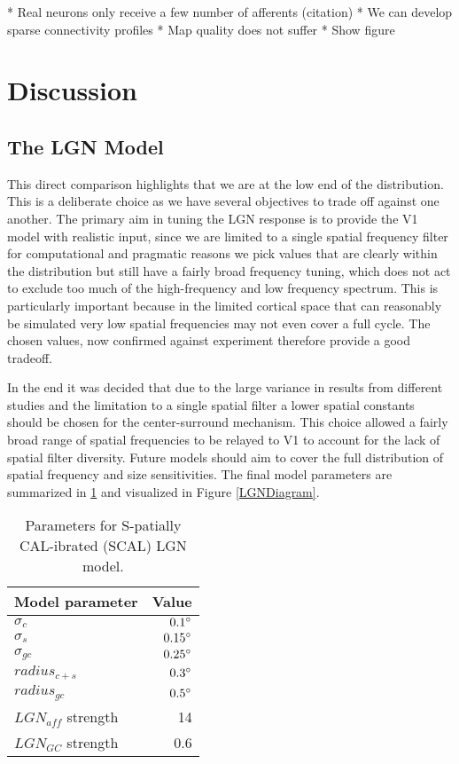 * Real neurons only receive a few number of afferents (citation)
* We can develop sparse connectivity profiles
* Map quality does not suffer
* Show figure


\section{Discussion}

\subsection{The LGN Model}

This direct comparison highlights that we are at the low end of the
distribution. This is a deliberate choice as we have several
objectives to trade off against one another. The primary aim in tuning
the LGN response is to provide the V1 model with realistic input,
since we are limited to a single spatial frequency filter for
computational and pragmatic reasons we pick values that are clearly
within the distribution but still have a fairly broad frequency
tuning, which does not act to exclude too much of the high-frequency
and low frequency spectrum. This is particularly important because in
the limited cortical space that can reasonably be simulated very low
spatial frequencies may not even cover a full cycle. The chosen
values, now confirmed against experiment therefore provide a good
tradeoff.

In the end it was decided that due to the large variance in results
from different studies and the limitation to a single spatial filter a
lower spatial constants should be chosen for the center-surround
mechanism. This choice allowed a fairly broad range of spatial
frequencies to be relayed to V1 to account for the lack of spatial
filter diversity. Future models should aim to cover the full
distribution of spatial frequency and size sensitivities. The final
model parameters are summarized in \ref{LGNTuning} and visualized in
Figure \ref{LGNDiagram}.
 
\begin{table}
  \centering
  \begin{adjustbox}{width=0.3\textwidth}
  \begin{tabular}{l | r}
    Model parameter   & Value \\
    \hline
    $\sigma_c$          & $0.1 \degree$  \\
    $\sigma_s$          & $0.15 \degree$ \\
    $\sigma_{gc}$        & $0.25 \degree$  \\
    $radius_{c+s}$       & $0.3 \degree$  \\
    $radius_{gc}$        & $0.5 \degree$  \\
    \hline
    $LGN_{aff}$ strength & 14 \\
    $LGN_{GC}$ strength  & 0.6 \\
  \end{tabular}
  \end{adjustbox}
  \caption{Parameters for S-patially CAL-ibrated (SCAL) LGN model.}
  \label{LGNTuning}
\end{table}


